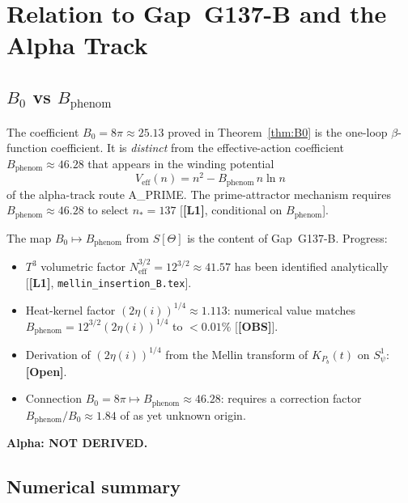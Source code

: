 \documentclass[12pt,a4paper]{article}
\theoremstyle{definition}
\theoremstyle{remark}
\newcommand{\OPEN}{\textbf{[Open]}}
\newcommand{\Lone}{\textbf{[L1]}}
\newcommand{\OBS}{\textbf{[OBS]}}
\newcommand{\Neff}{N_{\mathrm{eff}}}
\begin{document}
\section{Relation to Gap~G137-B and the Alpha Track}
\label{sec:alpha_track}

\subsection{$B_0$ vs $B_{\mathrm{phenom}}$}

The coefficient $B_0 = 8\pi \approx 25.13$ proved in Theorem~\ref{thm:B0}
is the one-loop $\beta$-function coefficient.
It is \emph{distinct} from the effective-action coefficient
$B_{\mathrm{phenom}} \approx 46.28$ that appears in the winding potential
\[
V_{\mathrm{eff}}(n) = n^2 - B_{\mathrm{phenom}}\,n\ln n
\]
of the alpha-track route A\_PRIME.
The prime-attractor mechanism requires $B_{\mathrm{phenom}} \approx 46.28$
to select $n_* = 137$ [\Lone, conditional on $B_{\mathrm{phenom}}$].

\begin{tcolorbox}[colback=orange!5!white,colframe=orange!55!black,
  title={Gap~G137-B (open)},breakable]
The map $B_0 \mapsto B_{\mathrm{phenom}}$ from $S[\Theta]$ is the content of
Gap~G137-B.  Progress:
\begin{itemize}
\item $T^3$ volumetric factor $\Neff^{3/2} = 12^{3/2} \approx 41.57$
  has been identified analytically [\Lone, \texttt{mellin\_insertion\_B.tex}].
\item Heat-kernel factor $(2\eta(i))^{1/4} \approx 1.113$:
  numerical value matches $B_{\mathrm{phenom}} = 12^{3/2}(2\eta(i))^{1/4}$
  to $< 0.01\%$ [\OBS].
\item Derivation of $(2\eta(i))^{1/4}$ from the Mellin transform of
  $K_{P_b}(t)$ on $S^1_\psi$: \OPEN.
\item Connection $B_0 = 8\pi \mapsto B_{\mathrm{phenom}} \approx 46.28$:
  requires a correction factor $B_{\mathrm{phenom}}/B_0 \approx 1.84$
  of as yet unknown origin.
\end{itemize}
\textbf{Alpha: NOT DERIVED.}
\end{tcolorbox}

\subsection{Numerical summary}
\end{document}
